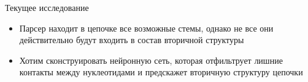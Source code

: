 \documentclass{beamer}
\begin{document}
\begin{frame}{Текущее исследование} 
\begin{itemize}
    \item Парсер находит в цепочке все возможные стемы, однако не все они действительно будут входить в состав вторичной структуры
    \item Хотим сконструировать нейронную сеть, которая отфильтрует лишние контакты между нуклеотидами и предскажет вторичную структуру цепочки
\end{itemize}
\vspace{0.5cm}
\end{frame}
\end{document}
